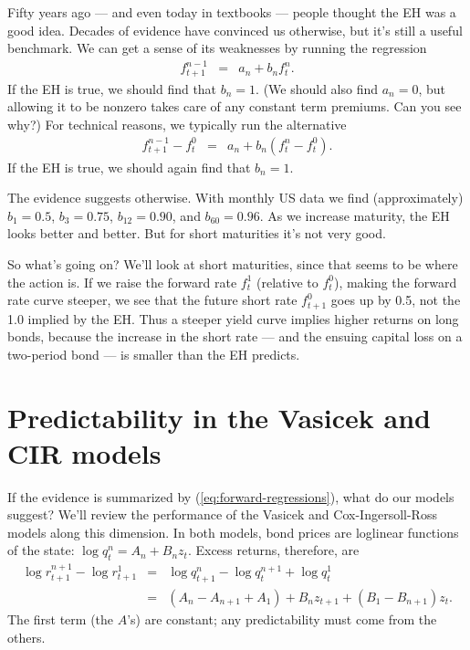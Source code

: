 \documentclass[11pt]{article}
\begin{document}
Fifty years ago --- and even today in textbooks --- people thought the EH was a good idea.
Decades of evidence have convinced us otherwise, but it's still a useful benchmark.
We can get a sense of its weaknesses by running the regression
\begin{eqnarray*}
    f^{n-1}_{t+1} &=& a_n + b_n f^n_t .
\end{eqnarray*}
If the EH is true, we should find that $b_n = 1$.
(We should also find $a_n=0$, but allowing it to be nonzero
takes care of any constant term premiums.
Can you see why?)
For technical reasons, we typically run the alternative
\begin{eqnarray}
    f^{n-1}_{t+1} - f^0_t &=& a_n + b_n (f^n_t - f^0_t) .
    \label{eq:forward-regressions}
\end{eqnarray}
If the EH is true, we should again find that $b_n = 1$.

The evidence suggests otherwise.
With monthly US data we find (approximately) $b_1 = 0.5$, $b_3 = 0.75$,
$b_{12} = 0.90$, and $b_{60} = 0.96$.
As we increase maturity, the EH looks better and better.
But for short maturities it's not very good.

So what's going on?
We'll look at short maturities, since that seems to be where the action is.
If we raise the forward rate $f^1_t$ (relative to $f^0_t$),
making the forward rate curve steeper,
we see that the future short rate $f^0_{t+1}$ goes up by 0.5,
not the 1.0 implied by the EH.
Thus a steeper yield curve implies higher returns on long bonds, because the
increase in the short rate --- and the ensuing capital loss on a two-period bond ---
is smaller than the EH predicts.



\section{Predictability in the Vasicek and CIR models}

If the evidence is summarized by (\ref{eq:forward-regressions}),
what do our models suggest?
We'll review the performance of the Vasicek and Cox-Ingersoll-Ross models
along this dimension.
In both models, bond prices are loglinear functions of the state:
$ \log q^n_t = A_n + B_n z_t$.
Excess returns, therefore, are
\begin{eqnarray*}
    \log r^{n+1}_{t+1} - \log r^{1}_{t+1} &=& \log q^n_{t+1} - \log q^{n+1}_t + \log q^1_t \\
            &=&  (A_n - A_{n+1}+A_1) + B_{n} z_{t+1} + (B_1 - B_{n+1} ) z_t   .
\end{eqnarray*}
The first term (the $A$'s) are constant;
any predictability must come from the others.
\end{document}
